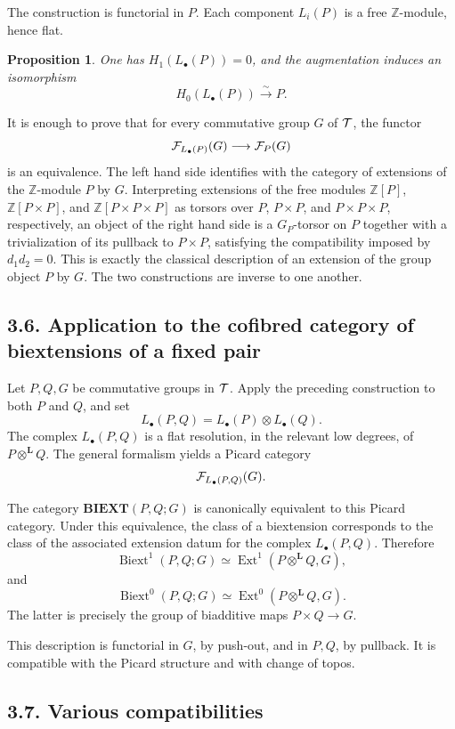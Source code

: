 \documentclass[11pt]{article}
\theoremstyle{plain}
\newtheorem{proposition}[theorem]{Proposition}
\theoremstyle{definition}
\theoremstyle{remark}
\newcommand{\bZ}{\mathbb Z}
\DeclareMathOperator{\Ext}{Ext}
\DeclareMathOperator{\Biext}{Biext}
\newcommand{\BIEXT}{\mathbf{BIEXT}}\newcommand{\GRAB}{\mathbf{GRAB}}
\newcommand{\bL}{\mathbf L}
\begin{document}
The construction is functorial in \(P\). Each component \(L_i(P)\) is a free
\(\bZ\)-module, hence flat.

\begin{proposition}
One has \(H_1(L_\bullet(P))=0\), and the augmentation induces an isomorphism
\[
H_0(L_\bullet(P))\xrightarrow{\sim}P.
\]
\end{proposition}

It is enough to prove that for every commutative group \(G\) of \(\mathcal T\), the
functor
\[
\mathcal F_{L_\bullet(P)}(G)\longrightarrow \mathcal F_P(G)
\]
is an equivalence. The left hand side identifies with the category of extensions
of the \(\bZ\)-module \(P\) by \(G\). Interpreting extensions of the free modules
\(\bZ[P]\), \(\bZ[P\times P]\), and \(\bZ[P\times P\times P]\) as torsors over
\(P\), \(P\times P\), and \(P\times P\times P\), respectively, an object of the
right hand side is a \(G_P\)-torsor on \(P\) together with a trivialization of its
pullback to \(P\times P\), satisfying the compatibility imposed by \(d_1d_2=0\).
This is exactly the classical description of an extension of the group object
\(P\) by \(G\). The two constructions are inverse to one another.

\subsection*{3.6. Application to the cofibred category of biextensions of a fixed pair}

Let \(P,Q,G\) be commutative groups in \(\mathcal T\). Apply the preceding construction
to both \(P\) and \(Q\), and set
\[
L_\bullet(P,Q)=L_\bullet(P)\otimes L_\bullet(Q).
\]
The complex \(L_\bullet(P,Q)\) is a flat resolution, in the relevant low degrees,
of \(P\otimes^{\bL}Q\). The general formalism yields a Picard category
\[
\mathcal F_{L_\bullet(P,Q)}(G).
\]

The category \(\BIEXT(P,Q;G)\) is canonically equivalent to this Picard category.
Under this equivalence, the class of a biextension corresponds to the class of the
associated extension datum for the complex \(L_\bullet(P,Q)\). Therefore
\[
\Biext^1(P,Q;G)\simeq
\Ext^1(P\otimes^{\bL}Q,G),
\]
and
\[
\Biext^0(P,Q;G)\simeq
\Ext^0(P\otimes^{\bL}Q,G).
\]
The latter is precisely the group of biadditive maps \(P\times Q\to G\).

This description is functorial in \(G\), by push-out, and in \(P,Q\), by
pullback. It is compatible with the Picard structure and with change of topos.

\subsection*{3.7. Various compatibilities}
\end{document}
